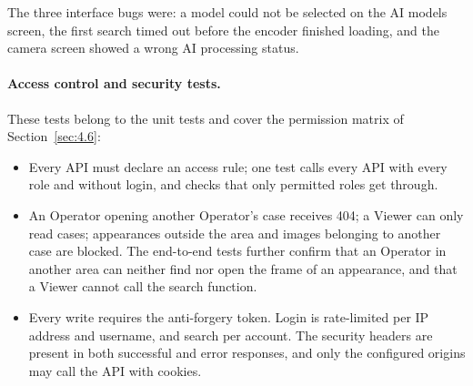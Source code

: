 The three interface bugs were: a model could not be selected on the AI models screen, the first search timed out before the encoder finished loading, and the camera screen showed a wrong AI processing status.

\paragraph{Access control and security tests.} These tests belong to the unit tests and cover the permission matrix of Section~\ref{sec:4.6}:
\begin{itemize}
    \item Every API must declare an access rule; one test calls every API with every role and without login, and checks that only permitted roles get through.
    \item An Operator opening another Operator's case receives 404; a Viewer can only read cases; appearances outside the area and images belonging to another case are blocked. The end-to-end tests further confirm that an Operator in another area can neither find nor open the frame of an appearance, and that a Viewer cannot call the search function.
    \item Every write requires the anti-forgery token. Login is rate-limited per IP address and username, and search per account. The security headers are present in both successful and error responses, and only the configured origins may call the API with cookies.
\end{itemize}
